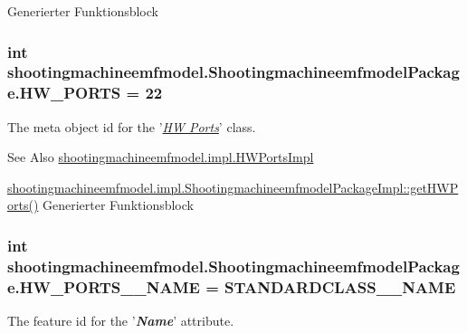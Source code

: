 Generierter Funktionsblock  \hypertarget{interfaceshootingmachineemfmodel_1_1_shootingmachineemfmodel_package_afa74b06d8a28f085369fdcb2b19b7b36}{
\subsubsection[{H\-W\-\_\-\-P\-O\-R\-T\-S}]{\setlength{\rightskip}{0pt plus 5cm}int shootingmachineemfmodel.\-Shootingmachineemfmodel\-Package.\-H\-W\-\_\-\-P\-O\-R\-T\-S = 22}}\label{interfaceshootingmachineemfmodel_1_1_shootingmachineemfmodel_package_afa74b06d8a28f085369fdcb2b19b7b36}
The meta object id for the '\hyperlink{classshootingmachineemfmodel_1_1impl_1_1_h_w_ports_impl}{{\itshape H\-W Ports}}' class.

\begin{DoxySeeAlso}{See Also}
\hyperlink{classshootingmachineemfmodel_1_1impl_1_1_h_w_ports_impl}{shootingmachineemfmodel.\-impl.\-H\-W\-Ports\-Impl} 

\hyperlink{classshootingmachineemfmodel_1_1impl_1_1_shootingmachineemfmodel_package_impl_a0e445554ec7e12a0acab69b315098594}{shootingmachineemfmodel.\-impl.\-Shootingmachineemfmodel\-Package\-Impl\-::get\-H\-W\-Ports()} Generierter Funktionsblock 
\end{DoxySeeAlso}
\hypertarget{interfaceshootingmachineemfmodel_1_1_shootingmachineemfmodel_package_a8c7830b95625a0ce6a38f99f0bbb4a6f}{
\subsubsection[{H\-W\-\_\-\-P\-O\-R\-T\-S\-\_\-\-\_\-\-N\-A\-M\-E}]{\setlength{\rightskip}{0pt plus 5cm}int shootingmachineemfmodel.\-Shootingmachineemfmodel\-Package.\-H\-W\-\_\-\-P\-O\-R\-T\-S\-\_\-\-\_\-\-N\-A\-M\-E = {\bf S\-T\-A\-N\-D\-A\-R\-D\-C\-L\-A\-S\-S\-\_\-\-\_\-\-N\-A\-M\-E}}}\label{interfaceshootingmachineemfmodel_1_1_shootingmachineemfmodel_package_a8c7830b95625a0ce6a38f99f0bbb4a6f}
The feature id for the '{\itshape {\bfseries Name}}' attribute.

